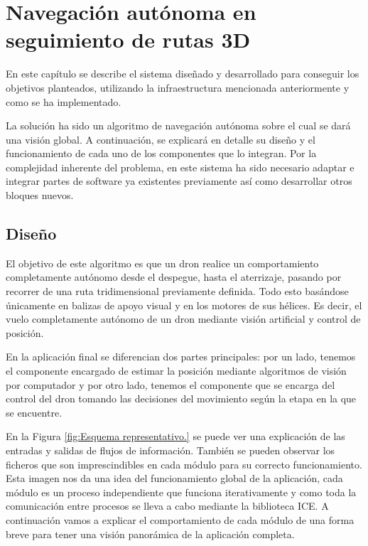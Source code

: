 \chapter{Navegación autónoma en seguimiento de rutas 3D}\label{cap.desarrollo}
\hspace{1cm} En este capítulo se describe el sistema diseñado y desarrollado para conseguir los objetivos planteados, utilizando la infraestructura mencionada anteriormente y como se ha implementado.

\hspace{1cm} La solución ha sido un algoritmo de navegación autónoma sobre el cual se dará una visión global. A continuación, se explicará en detalle su diseño y el funcionamiento de cada uno de los componentes que lo integran. Por la complejidad inherente del problema, en este sistema ha sido necesario adaptar e integrar partes de software ya existentes previamente así como desarrollar otros bloques nuevos.


\section{Diseño}
\hspace{1cm} El objetivo de este algoritmo es que un dron realice un comportamiento completamente autónomo desde el despegue, hasta el aterrizaje, pasando por recorrer de una ruta tridimensional previamente definida. Todo esto basándose únicamente en balizas de apoyo visual y en los motores de sus hélices. Es decir, el vuelo completamente autónomo de un dron mediante visión artificial y control de posición.

\hspace{1cm} En la aplicación final se diferencian dos partes principales: por un lado, tenemos el componente encargado de estimar la posición mediante algoritmos de visión por computador y por otro lado, tenemos el componente que se encarga del control del dron tomando las decisiones del movimiento según la etapa en la que se encuentre.

\hspace{1cm} En la Figura \ref{fig:Esquema representativo.} se puede ver una explicación de las entradas y salidas de flujos de información. También se pueden observar los ficheros que son imprescindibles en cada módulo para su correcto funcionamiento. Esta imagen nos da una idea del funcionamiento global de la aplicación, cada módulo es un proceso independiente que funciona iterativamente y como toda la comunicación entre procesos se lleva a cabo mediante la biblioteca ICE. A continuación vamos a explicar el comportamiento de cada módulo de una forma breve para tener una visión panorámica de la aplicación completa.

